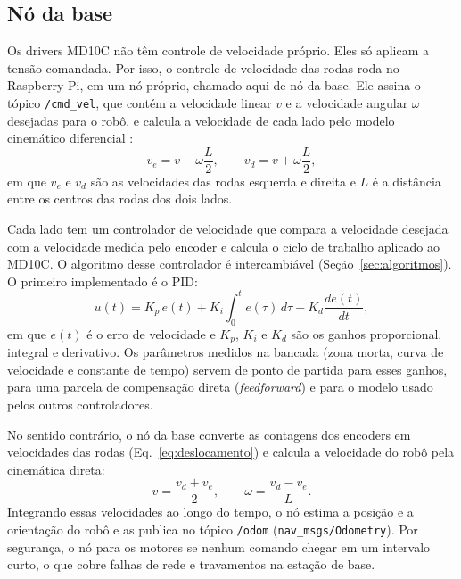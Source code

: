 \subsection{Nó da base}

Os drivers MD10C não têm controle de velocidade próprio. Eles só aplicam
a tensão comandada. Por isso, o controle de velocidade das rodas roda no
Raspberry Pi, em um nó próprio, chamado aqui de nó da base. Ele assina o
tópico \texttt{/cmd\_vel}, que contém a velocidade linear $v$ e a
velocidade angular $\omega$ desejadas para o robô, e calcula a velocidade
de cada lado pelo modelo cinemático diferencial \cite{siegwart2011}:
\begin{equation}
	\label{eq:cinematica-inversa}
	v_e = v - \omega \frac{L}{2}, \qquad v_d = v + \omega \frac{L}{2},
\end{equation}
em que $v_e$ e $v_d$ são as velocidades das rodas esquerda e direita e
$L$ é a distância entre os centros das rodas dos dois lados.

Cada lado tem um controlador de velocidade que compara a velocidade
desejada com a velocidade medida pelo encoder e calcula o ciclo de
trabalho aplicado ao MD10C. O algoritmo desse controlador é intercambiável
(Seção~\ref{sec:algoritmos}). O primeiro implementado é o PID:
\begin{equation}
	\label{eq:pid}
	u(t) = K_p\, e(t) + K_i \int_0^t e(\tau)\, d\tau + K_d \frac{de(t)}{dt},
\end{equation}
em que $e(t)$ é o erro de velocidade e $K_p$, $K_i$ e $K_d$ são os ganhos
proporcional, integral e derivativo. Os parâmetros medidos na bancada (zona
morta, curva de velocidade e constante de tempo) servem de ponto de
partida para esses ganhos, para uma parcela de compensação direta
(\textit{feedforward}) e para o modelo usado pelos outros controladores.

No sentido contrário, o nó da base converte as contagens dos encoders em
velocidades das rodas (Eq.~\ref{eq:deslocamento}) e calcula a velocidade
do robô pela cinemática direta:
\begin{equation}
	\label{eq:cinematica-direta}
	v = \frac{v_d + v_e}{2}, \qquad \omega = \frac{v_d - v_e}{L}.
\end{equation}
Integrando essas velocidades ao longo do tempo, o nó estima a posição e a
orientação do robô e as publica no tópico \texttt{/odom}
(\texttt{nav\_msgs/Odometry}). Por segurança, o nó para os motores se
nenhum comando chegar em um intervalo curto, o que cobre falhas de rede e
travamentos na estação de base.

